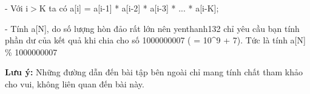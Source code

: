 - Với i$>$K ta có a[i] = a[i-1] * a[i-2] * a[i-3] * ... * a[i-K];


- Tính a[N], do số lượng hòn đảo rất lớn nên yenthanh132 chỉ yêu cầu bạn tính phần dư của kết quả khi chia cho số 1000000007 ( = 10^9 + 7). Tức là tính a[N] \% 1000000007

\textbf{Lưu ý: } Những đường dẫn đến bài tập bên ngoài chỉ mang tính chất tham khảo cho vui, không liên quan đến bài này.